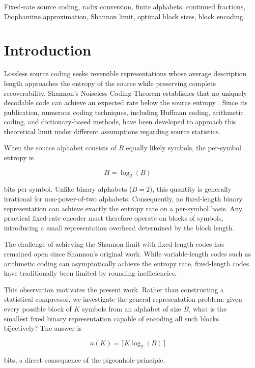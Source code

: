 \documentclass[10pt, onecolumn]{IEEEtran}
\begin{document}
\begin{IEEEkeywords}
Fixed-rate source coding, radix conversion, finite alphabets, continued fractions, Diophantine approximation, Shannon limit, optimal block sizes, block encoding.
\end{IEEEkeywords}

\section{Introduction}

Lossless source coding seeks reversible representations whose average description length approaches the entropy of the source while preserving complete recoverability. Shannon's Noiseless Coding Theorem establishes that no uniquely decodable code can achieve an expected rate below the source entropy \cite{shannon}. Since its publication, numerous coding techniques, including Huffman coding, arithmetic coding, and dictionary-based methods, have been developed to approach this theoretical limit under different assumptions regarding source statistics.

When the source alphabet consists of \(B\) equally likely symbols, the per-symbol entropy is

\[
H = \log_2(B)
\]

bits per symbol. Unlike binary alphabets ($B=2$), this quantity is generally irrational for non-power-of-two alphabets. Consequently, no fixed-length binary representation can achieve exactly the entropy rate on a per-symbol basis. Any practical fixed-rate encoder must therefore operate on blocks of symbols, introducing a small representation overhead determined by the block length.

The challenge of achieving the Shannon limit with fixed-length codes has remained open since Shannon's original work. While variable-length codes such as arithmetic coding can asymptotically achieve the entropy rate, fixed-length codes have traditionally been limited by rounding inefficiencies.

This observation motivates the present work. Rather than constructing a statistical compressor, we investigate the general representation problem: given every possible block of \(K\) symbols from an alphabet of size \(B\), what is the smallest fixed binary representation capable of encoding all such blocks bijectively? The answer is

\[
n(K) = \lceil K\log_2(B)\rceil
\]

bits, a direct consequence of the pigeonhole principle.
\end{document}
